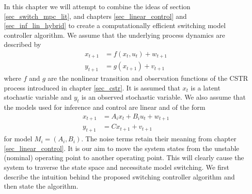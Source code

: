 In this chapter we will attempt to combine the ideas of section \ref{sec_switch_mpc_lit}, and chapters \ref{sec_linear_control} and \ref{sec_inf_lin_hybrid} to create a computationally efficient switching model controller algorithm. We assume that the underlying process dynamics are described by
\begin{equation}
\begin{aligned}
x_{t+1} &= f(x_t, u_t) + w_{t+1}  \\
y_{t+1} &= g(x_{t+1}) + v_{t+1}  
\end{aligned}
\label{eq_lin_system_in_rbpf}
\end{equation}
where $f$ and $g$ are the nonlinear transition and observation functions of the CSTR process introduced in chapter \ref{sec_cstr}. It is assumed that $x_t$ is a latent stochastic variable and $y_t$ is an observed stochastic variable. We also assume that the models used for inference and control are linear and of the form 
\begin{equation}
\begin{aligned}
x_{t+1} &= A_ix_t + B_iu_t + w_{t+1} \\
y_{t+1} &= Cx_{t+1} + v_{t+1} 
\end{aligned}
\label{eq_lin_system_control_rbpf}
\end{equation}
for model $M_i=(A_i, B_i)$. The noise terms retain their meaning from chapter \ref{sec_linear_control}. It is our aim to move the system states from the  unstable (nominal) operating point to another operating point. This will clearly cause the system to traverse the state space and necessitate model switching. We first describe the intuition behind the proposed switching controller algorithm and then state the algorithm.

